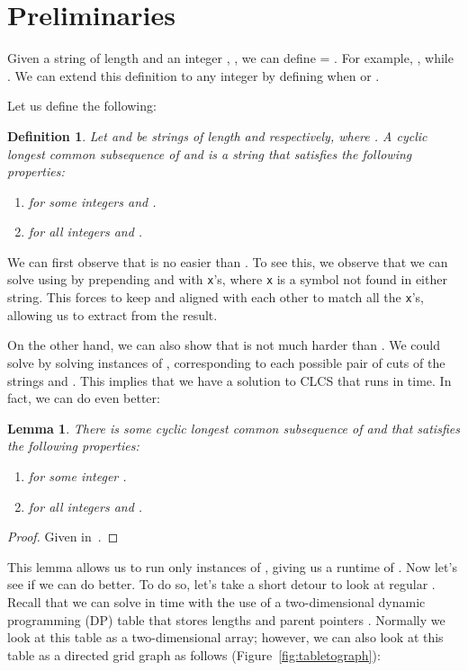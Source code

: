 \documentclass{article}
\newtheorem{definition}{Definition}
\newtheorem{lemma}{Lemma}
\begin{document}
\section{Preliminaries}

Given a string  of length  and an integer , , we can define  = .  For example, , while .  We can extend this definition to any integer  by defining  when  or .

Let us define the following:

\begin{definition}
Let  and  be strings of length  and  respectively, where .  A \emph{cyclic longest common subsequence} of  and   is a string that satisfies the following properties:
\begin{enumerate}
\item  for some integers  and .
\item  for all integers  and .
\end{enumerate}
\end{definition}

We can first observe that  is no easier than .  To see this, we observe that we can solve  using  by prepending  and  with  \verb|x|'s, where \verb|x| is a symbol not found in either string.  This forces  to keep  and  aligned with each other to match all the \verb|x|'s, allowing us to extract  from the result.

On the other hand, we can also show that  is not much harder than .  We could solve  by solving  instances of , corresponding to each possible pair of cuts of the strings  and .  This implies that we have a solution to CLCS that runs in  time.  In fact, we can do even better:

\begin{lemma}
There is some cyclic longest common subsequence of  and   that satisfies the following properties:
\begin{enumerate}
\item  for some integer .
\item  for all integers  and .
\end{enumerate}
\end{lemma}
\begin{proof}
Given in~\cite{M90}.
\end{proof}

This lemma allows us to run only  instances of , giving us a runtime of .  Now let's see if we can do better.  To do so, let's take a short detour to look at regular .  Recall that we can solve  in  time with the use of a two-dimensional dynamic programming (DP) table that stores lengths  and parent pointers .  Normally we look at this table as a two-dimensional array; however, we can also look at this table as a directed grid graph  as follows (Figure~\ref{fig:tabletograph}):
\end{document}
